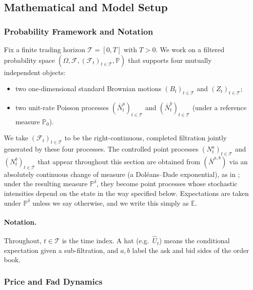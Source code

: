 \documentclass[11pt,a4paper]{article}
\theoremstyle{plain}
\theoremstyle{definition}
\newcommand{\E}{\mathbb{E}}
\newcommand{\Prob}{\mathbb{P}}
\newcommand{\F}{\mathcal{F}}
\begin{document}
\subsection{Mathematical and Model Setup}
\label{subsec:model}

\subsubsection{Probability Framework and Notation}

Fix a finite trading horizon $\mathcal{T} = [0,T]$ with $T>0$.
We work on a filtered probability space
$(\Omega, \F, (\F_t)_{t\in\mathcal{T}}, \Prob)$ that supports four
mutually independent objects:
\begin{itemize}[noitemsep]
  \item two one-dimensional standard Brownian motions $(B_t)_{t\in\mathcal{T}}$
        and $(Z_t)_{t\in\mathcal{T}}$;
  \item two unit-rate Poisson processes $(\bar{N}^a_t)_{t\in\mathcal{T}}$ and
        $(\bar{N}^b_t)_{t\in\mathcal{T}}$ (under a reference measure
        $\Prob_0$).
\end{itemize}
We take $(\F_t)_{t\in\mathcal{T}}$ to be the right-continuous, completed
filtration jointly generated by these four processes. The controlled point
processes $(N^a_t)_{t\in\mathcal{T}}$ and $(N^b_t)_{t\in\mathcal{T}}$ that
appear throughout this section are obtained from $(\bar{N}^{a,b})$ via an
absolutely continuous change of measure (a Doléans--Dade exponential), as in
\cite{barucci2025market}; under the resulting measure $\Prob^{\delta}$,
they become point processes whose stochastic intensities depend on the
state in the way specified below. Expectations are taken under
$\Prob^{\delta}$ unless we say otherwise, and we write this simply as $\E$.

\paragraph{Notation.} Throughout, $t\in\mathcal{T}$ is the time index.
A hat (e.g.\ $\hat{U}_t$) means the conditional expectation given a
sub-filtration, and $a,b$ label the ask and bid sides of the order book.

\subsubsection{Price and Fad Dynamics}
\end{document}

